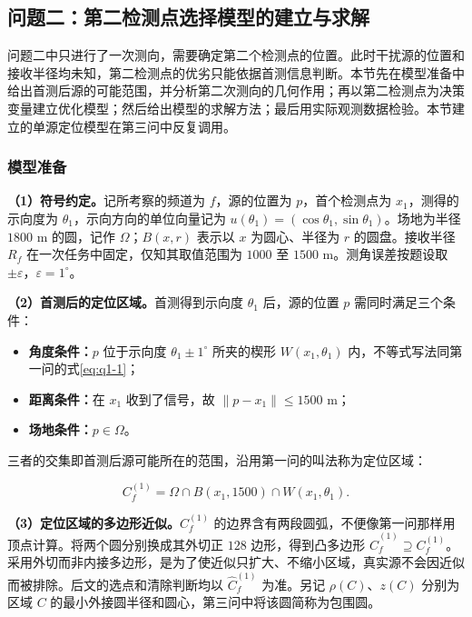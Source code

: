 \subsection{问题二：第二检测点选择模型的建立与求解}\label{sec:q2}

问题二中只进行了一次测向，需要确定第二个检测点的位置。此时干扰源的位置和接收半径均未知，第二检测点的优劣只能依据首测信息判断。本节先在模型准备中给出首测后源的可能范围，并分析第二次测向的几何作用；再以第二检测点为决策变量建立优化模型；然后给出模型的求解方法；最后用实际观测数据检验。本节建立的单源定位模型在第三问中反复调用。

\subsubsection{模型准备}\label{sec:q2-1}

\textbf{（1）符号约定。}记所考察的频道为 $f$，源的位置为 $p$，首个检测点为 $x_1$，测得的示向度为 $\theta_1$，示向方向的单位向量记为 $u(\theta_1)=(\cos\theta_1,\sin\theta_1)$。场地为半径 $1800$ m 的圆，记作 $\Omega$；$B(x,r)$ 表示以 $x$ 为圆心、半径为 $r$ 的圆盘。接收半径 $R_f$ 在一次任务中固定，仅知其取值范围为 $1000$ 至 $1500$ m。测角误差按题设取 $\pm\varepsilon$，$\varepsilon=1^\circ$。

\textbf{（2）首测后的定位区域。}首测得到示向度 $\theta_1$ 后，源的位置 $p$ 需同时满足三个条件：

\begin{itemize}
\item \textbf{角度条件：}$p$ 位于示向度 $\theta_1\pm1^\circ$ 所夹的楔形 $W(x_1,\theta_1)$ 内，不等式写法同第一问的式\eqref{eq:q1-1}；
\item \textbf{距离条件：}在 $x_1$ 收到了信号，故 $\|p-x_1\|\le1500$ m；
\item \textbf{场地条件：}$p\in\Omega$。
\end{itemize}

三者的交集即首测后源可能所在的范围，沿用第一问的叫法称为定位区域：

\begin{equation}\label{eq:q2-1}
C_f^{(1)}=\Omega\cap B(x_1,1500)\cap W(x_1,\theta_1).
\end{equation}

\textbf{（3）定位区域的多边形近似。}$C_f^{(1)}$ 的边界含有两段圆弧，不便像第一问那样用顶点计算。将两个圆分别换成其外切正 $128$ 边形，得到凸多边形 $\widehat C_f^{(1)}\supseteq C_f^{(1)}$。采用外切而非内接多边形，是为了使近似只扩大、不缩小区域，真实源不会因近似而被排除。后文的选点和清除判断均以 $\widehat C_f^{(1)}$ 为准。另记 $\rho(C)$、$z(C)$ 分别为区域 $C$ 的最小外接圆半径和圆心，第三问中将该圆简称为包围圆。

